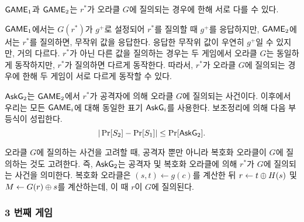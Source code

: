 $\textsf{GAME}_1$과 $\textsf{GAME}_2$는 $r^*$가 오라클 $G$에 질의되는 경우에 한해 서로 다를 수
있다.

\begin{memo}
	$\textsf{GAME}_1$에서는 $G(r^*)$가 $g^+$로 설정되어 $r^*$를 질의할 때 $g^+$를
	응답하지만, $\textsf{GAME}_2$에서는 $r^*$를 질의하면, 무작위 값을 응답한다. 응답한
	무작위 값이 우연히 $g^+$일 수 있지만, 거의 다르다. $r^*$가 아닌 다른 값을
	질의하는 경우는 두 게임에서 오라클 $G$는 동일하게 동작하지만, $r^*$가
	질의하면 다르게 동작한다. 따라서, $r^*$가 오라클 $G$에 질의되는 경우에 한해
	두 게임이 서로 다르게 동작할 수 있다.
\end{memo}

$\textsf{AskG}_2$는 $\textsf{GAME}_2$에서 $r^*$가 공격자에 의해 오라클 $G$에 질의되는 사건이다.
이후에서 우리는 모든 $\textsf{GAME}_i$에 대해 동일한 표기 $\textsf{AskG}_i$를 사용한다.
보조정리에 의해 다음 부등식이 성립한다.
$$
	|\Pr[S_2] - \Pr[S_1]| \leq \Pr[\textsf{AskG}_2].
$$

\begin{memo}
	오라클 $G$에 질의하는 사건을 고려할 때, 공격자 뿐만 아니라 복호화 오라클이
	$G$에 질의하는 것도 고려한다. 즉, $\textsf{AskG}_2$는 공격자 및 복호화 오라클에 의해
	$r^*$가 $G$에 질의되는 사건을 의미한다. 복호화 오라클은 $(s, t) \gets
	g(c)$를 계산한 뒤 $r \gets t \oplus H(s)$ 및 $M \gets G(r) \oplus s$를
	계산하는데, 이 때 $r$이 $G$에 질의된다.
\end{memo}

\newpage
\subsubsection{3 번째 게임}

